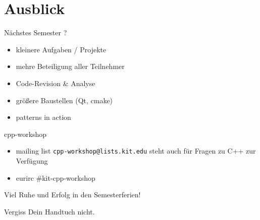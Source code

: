 \section{Ausblick}


\begin{frame}{Nächstes Semester}
	?
	
	\begin{itemize}
		\item kleinere Aufgaben / Projekte
		\item mehre Beteiligung aller Teilnehmer
		\item Code-Revision \& Analyse
		\item größere Baustellen (Qt, cmake)
		\item patterns in action
	\end{itemize}
\end{frame}

\begin{frame}{cpp-workshop}
	\begin{itemize}
		\item mailing list \texttt{cpp-workshop@lists.kit.edu} steht auch für Fragen zu C++ zur Verfügung
		\item eurirc \#kit-cpp-workshop
	\end{itemize}
	
	\vspace{1em}
	
	Viel Ruhe und Erfolg in den Semesterferien!
	
	Vergiss Dein Handtuch nicht.
\end{frame}
